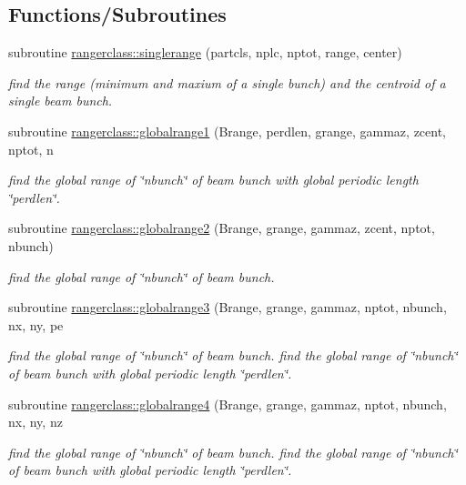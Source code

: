 \subsection*{Functions/\+Subroutines}
\begin{DoxyCompactItemize}
\item 
subroutine \mbox{\hyperlink{namespacerangerclass_a5e8eb23d6d5bf16cd2d36cd10ecf6f70}{rangerclass\+::singlerange}} (partcls, nplc, nptot, range, center)
\begin{DoxyCompactList}\small\item\em find the range (minimum and maxium of a single bunch) and the centroid of a single beam bunch. \end{DoxyCompactList}\item 
subroutine \mbox{\hyperlink{namespacerangerclass_a888ad4da7ecf705d91306f3922f210af}{rangerclass\+::globalrange1}} (Brange, perdlen, grange, gammaz, zcent, nptot, n
\begin{DoxyCompactList}\small\item\em find the global range of \char`\"{}nbunch\char`\"{} of beam bunch with global periodic length \char`\"{}perdlen\char`\"{}. \end{DoxyCompactList}\item 
subroutine \mbox{\hyperlink{namespacerangerclass_ad13f3def5e46e11250600f362cf040a6}{rangerclass\+::globalrange2}} (Brange, grange, gammaz, zcent, nptot, nbunch)
\begin{DoxyCompactList}\small\item\em find the global range of \char`\"{}nbunch\char`\"{} of beam bunch. \end{DoxyCompactList}\item 
subroutine \mbox{\hyperlink{namespacerangerclass_ad0b08fe4b8a1e2cbd7de8106b038e262}{rangerclass\+::globalrange3}} (Brange, grange, gammaz, nptot, nbunch, nx, ny, pe
\begin{DoxyCompactList}\small\item\em find the global range of \char`\"{}nbunch\char`\"{} of beam bunch. find the global range of \char`\"{}nbunch\char`\"{} of beam bunch with global periodic length \char`\"{}perdlen\char`\"{}. \end{DoxyCompactList}\item 
subroutine \mbox{\hyperlink{namespacerangerclass_aa1f850f78b90482f120d7104efc7bcdf}{rangerclass\+::globalrange4}} (Brange, grange, gammaz, nptot, nbunch, nx, ny, nz
\begin{DoxyCompactList}\small\item\em find the global range of \char`\"{}nbunch\char`\"{} of beam bunch. find the global range of \char`\"{}nbunch\char`\"{} of beam bunch with global periodic length \char`\"{}perdlen\char`\"{}. \end{DoxyCompactList}\end{DoxyCompactItemize}
